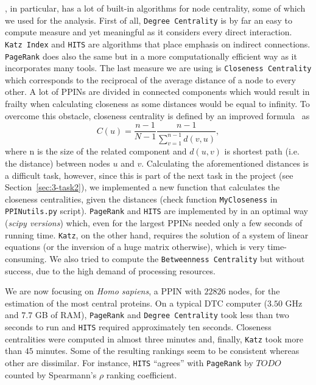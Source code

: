 \NX, in particular, has a lot of built-in algorithms for node centrality, some of which we used for the analysis. First of all, \texttt{Degree Centrality} is by far an easy to compute measure and yet meaningful as it considers every direct interaction. \texttt{Katz Index} and \texttt{HITS} are algorithms that place emphasis on indirect connections. \texttt{PageRank} does also the same but in a more computationally efficient way as it incorporates many tools. The last measure we are using is \texttt{Closeness Centrality} which corresponds to the reciprocal of the average distance of a node to every other. A lot of PPINs are divided in connected components which would result in frailty when calculating closeness as some distances would be equal to infinity. To overcome this obstacle, closeness centrality is defined by an improved formula~\cite{wasserman1994social} as
\begin{equation}
	C(u) = \frac{n-1}{N-1} \frac{n - 1}{\sum_{v=1}^{n-1} d(v, u)},
\end{equation}
where n is the size of the related component and $d(u,v)$ is shortest path (i.e. the distance) between nodes $u$ and $v$. Calculating the aforementioned distances is a difficult task, however, since this is part of the next task in the project (see Section~\ref{sec:3-task2}), we implemented a new function that calculates the closeness centralities, given the distances (check function \texttt{MyCloseness} in \texttt{PPINutils.py} script). \texttt{PageRank} and \texttt{HITS} are implemented by \NX in an optimal way (\textit{scipy versions}) which, even for the largest PPINs needed only a few seconds of running time. \texttt{Katz}, on the other hand, requires the solution of a system of linear equations (or the inversion of a huge matrix otherwise), which is very time-consuming. We also tried to compute the \texttt{Betweenness Centrality} but without success, due to the high demand of processing resources.

We are now focusing on \textit{Homo sapiens}, a PPIN with $22826$ nodes, for the estimation of the most central proteins. On a typical DTC computer ($3.50$ GHz and $7.7$ GB of RAM), \texttt{PageRank} and \texttt{Degree Centrality} took less than two seconds to run and \texttt{HITS} required approximately ten seconds. Closeness centralities were computed in almost three minutes and, finally, \texttt{Katz} took more than $45$ minutes. Some of the resulting rankings seem to be consistent whereas other are dissimilar. For instance, \texttt{HITS} ``agrees'' with \texttt{PageRank} by $TODO$ counted by Spearmann's $\rho$ ranking coefficient. 


